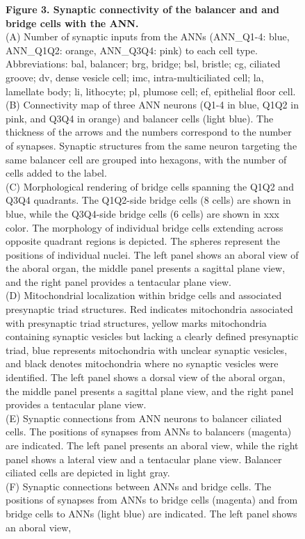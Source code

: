 \documentclass[
  11pt,
]{article}
\begin{document}
\begin{figure}[H]
\caption{\textbf{Figure 3. Synaptic connectivity of the balancer and and
bridge cells with the ANN.}\\
(A) Number of synaptic inputs from the ANNs (ANN\_Q1-4: blue, ANN\_Q1Q2:
orange, ANN\_Q3Q4: pink) to each cell type. Abbreviations: bal,
balancer; brg, bridge; bsl, bristle; cg, ciliated groove; dv, dense
vesicle cell; imc, intra-multiciliated cell; la, lamellate body; li,
lithocyte; pl, plumose cell; ef, epithelial floor cell.\\
(B) Connectivity map of three ANN neurons (Q1-4 in blue, Q1Q2 in pink,
and Q3Q4 in orange) and balancer cells (light blue). The thickness of
the arrows and the numbers correspond to the number of synapses.
Synaptic structures from the same neuron targeting the same balancer
cell are grouped into hexagons, with the number of cells added to the
label.\\
(C) Morphological rendering of bridge cells spanning the Q1Q2 and Q3Q4
quadrants. The Q1Q2-side bridge cells (8 cells) are shown in blue, while
the Q3Q4-side bridge cells (6 cells) are shown in xxx color. The
morphology of individual bridge cells extending across opposite quadrant
regions is depicted. The spheres represent the positions of individual
nuclei. The left panel shows an aboral view of the aboral organ, the
middle panel presents a sagittal plane view, and the right panel
provides a tentacular plane view.\\
(D) Mitochondrial localization within bridge cells and associated
presynaptic triad structures. Red indicates mitochondria associated with
presynaptic triad structures, yellow marks mitochondria containing
synaptic vesicles but lacking a clearly defined presynaptic triad, blue
represents mitochondria with unclear synaptic vesicles, and black
denotes mitochondria where no synaptic vesicles were identified. The
left panel shows a dorsal view of the aboral organ, the middle panel
presents a sagittal plane view, and the right panel provides a
tentacular plane view.\\
(E) Synaptic connections from ANN neurons to balancer ciliated cells.
The positions of synapses from ANNs to balancers (magenta) are
indicated. The left panel presents an aboral view, while the right panel
shows a lateral view and a tentacular plane view. Balancer ciliated
cells are depicted in light gray.\\
(F) Synaptic connections between ANNs and bridge cells. The positions of
synapses from ANNs to bridge cells (magenta) and from bridge cells to
ANNs (light blue) are indicated. The left panel shows an aboral view,
}
\end{figure}
\end{document}
